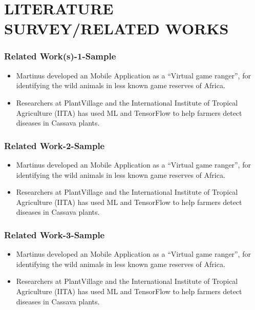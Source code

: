 \documentclass[c]{beamer}
\begin{document}
\section{LITERATURE SURVEY/RELATED WORKS}
\begin{frame} [c]
    \frametitle{Related Work(s)-1-Sample}
    \begin{itemize}
    \justifying
          \item Martinus  developed an Mobile Application as a “Virtual game ranger”, for identifying the wild animals in less known game reserves of Africa. 

        \item Researchers at PlantVillage and the International Institute of Tropical Agriculture (IITA) has used ML and TensorFlow to help farmers detect diseases in Cassava plants.
       \end{itemize} 
      
\end{frame}
\begin{frame} [c]
    \frametitle{Related Work-2-Sample}
    \begin{itemize}
    \justifying
          \item Martinus developed an Mobile Application as a “Virtual game ranger”, for identifying the wild animals in less known game reserves of Africa.

        \item Researchers at PlantVillage and the International Institute of Tropical Agriculture (IITA)  has used ML and TensorFlow to help farmers detect diseases in Cassava plants.
       \end{itemize} 
      
\end{frame}
\begin{frame} [c]
    \frametitle{Related Work-3-Sample}
    \begin{itemize}
    \justifying
          \item Martinus developed an Mobile Application as a “Virtual game ranger”, for identifying the wild animals in less known game reserves of Africa.

        \item Researchers at PlantVillage and the International Institute of Tropical Agriculture (IITA) has used ML and TensorFlow to help farmers detect diseases in Cassava plants.
       \end{itemize} 
      
\end{frame}
\end{document}
